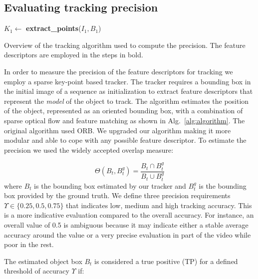 \subsection{Evaluating tracking precision}
\label{sec:accuracy}

\begin{algorithm}[h]
 $K_{1} \gets$ \textbf{extract\_points}($I_{1},B_1$)\;
 \caption{\label{alg:algorithm}Overview of the tracking algorithm used to compute the precision. The feature descriptors are employed in the steps in bold. }
\end{algorithm}

In order to measure the precision of the feature descriptors for tracking we employ a sparse key-point based tracker. The tracker requires a bounding box in the initial image of a sequence as initialization to extract feature descriptors that represent the \textit{model} of the object to track. The algorithm estimates the position of the object, represented as an oriented bounding box, with a combination of sparse optical flow and feature matching as shown in Alg.~\ref{alg:algorithm}. The original algorithm used ORB. We upgraded our algorithm making it more modular and able to cope with any possible feature descriptor. To estimate the precision we used the widely accepted overlap measure:

\begin{equation}
	\Theta (B_{t}, B_{t}^g) = \frac{B_{t} \cap B_t^g}{B_{t} \cup B_t^g}
\end{equation}
where \textit{$B_{t}$} is the bounding box estimated by our tracker and
\textit{$B_t^g$} is the bounding box provided by the ground truth. We define 
three precision requirements $\Upsilon \in \{0.25, 0.5, 0.75\}$ that indicates low, medium and high tracking accuracy. This is a more indicative evaluation compared to the overall accuracy. For instance, an overall value of 0.5 is ambiguous because it may indicate either a stable average accuracy around the value or a very precise evaluation in part of the video while poor in the rest.

The estimated object box \textit{$B_{t}$} is considered a true positive (TP) for a defined threshold of
accuracy $\Upsilon$ if:

